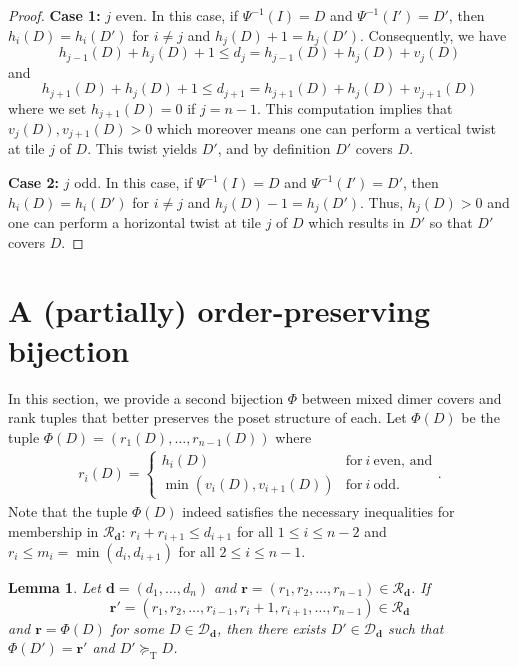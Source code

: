 \documentclass{amsart}
\def\bfd{{\mathbf{d}}}
\newtheorem{lemma}[theorem]{Lemma}
\theoremstyle{definition}
\newcommand{\geqt}{\succeq_{\text{T}}}
\begin{document}
\begin{proof}
{\noindent
\textbf{Case 1:} $j$ even. In this case, if $\Psi^{-1}(I)=D$ and $\Psi^{-1}(I')=D'$, then $h_i(D)=h_i(D')$ for $i\neq j$ and $h_j(D)+1=h_j(D')$. Consequently, we have \[
h_{j-1}(D)+h_j(D)+1\le d_j=h_{j-1}(D)+h_j(D)+v_j(D)
\]
and
\[
h_{j+1}(D)+h_j(D)+1\le d_{j+1}=h_{j+1}(D)+h_j(D)+v_{j+1}(D)
\] 
where we set $h_{j+1}(D) = 0$ if $j = n-1$. This computation implies that  $v_j(D),v_{j+1}(D)>0$ which moreover means one can perform a vertical twist at tile $j$ of $D$. This twist yields $D'$, and by definition $D'$ covers $D$.
\bigskip

\noindent
\textbf{Case 2:} $j$ odd. In this case, if $\Psi^{-1}(I)=D$ and $\Psi^{-1}(I')=D'$, then $h_i(D)=h_i(D')$ for $i\neq j$ and $h_j(D)-1=h_j(D')$. Thus, $h_j(D)>0$ and one can perform a horizontal twist at tile $j$ of $D$ which results in $D'$ so that $D'$ covers $D$.} 
 \end{proof}

\section{A (partially) order-preserving bijection}\label{sec:opbij}

In this section, we provide a second bijection $\Phi$ between mixed dimer covers and rank tuples that better preserves the poset structure of each.  Let $\Phi(D)$ be the tuple $\Phi(D)=(r_1(D),\ldots,r_{n-1}(D))$ where \begin{align}
    r_i(D)=\begin{cases}
        h_i(D) & \text{for}~i~\text{even, and}\\
        \min(v_i(D),v_{i+1}(D)) & \text{for}~i~\text{odd.}
    \end{cases}.\label{eq:def_of_Phi}
\end{align}
Note that the tuple $\Phi(D)$ indeed satisfies the necessary inequalities for membership in $\mathcal{R}_\bfd$: $r_{i}+r_{i+1}\leq d_{i+1}$ for all $1\leq i\leq n-2$ and $r_i\leq m_i = \min(d_{i},d_{i+1})$ for all $2\leq i\leq n-1$.  

\begin{lemma}\label{lem:moving_up}
    Let $\mathbf{d}=(d_1,\hdots,d_n)$ and $\mathbf{r}=(r_1,r_2,\ldots,r_{n-1})\in \mathcal{R}_{\mathbf{d}}$. If \[\mathbf{r}'=(r_1,r_2,\ldots,r_{i-1},r_i+1,r_{i+1},\ldots,r_{n-1})\in \mathcal{R}_{\mathbf{d}}\] and $\mathbf{r}=\Phi(D)$ for some $D\in \mathcal{D}_{\mathbf{d}}$, then there exists $D'\in\mathcal{D}_{\mathbf{d}}$ such that $\Phi(D')=\mathbf{r}'$ and $D'\geqt D$.
\end{lemma}
\end{document}
